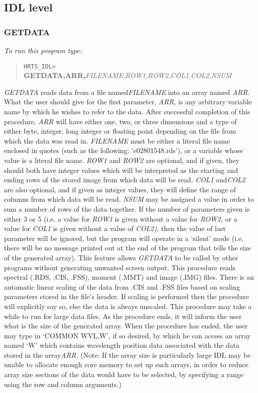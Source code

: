 \subsection{IDL level}    

\subsubsection{GETDATA}

{\em To run this program type:}
\begin{quote}
{\tt HRTS\_IDL> }{\bf GETDATA,ARR,}{\it FILENAME,ROW1,ROW2,COL1,COL2,NSUM}  
\end{quote}
{\em GETDATA} reads data from a file named{\em FILENAME} into an array named       
{\em ARR.}  What the user should give for the first parameter, {\em ARR,} is any
 arbitrary variable name by which he wishes to refer to the data.  After
 successful completion of this procedure, {\em ARR} will have either one, two,
 or three dimensions and a type of either byte, integer, long integer or
 floating point depending on the file from which the data was read in.
{\em FILENAME} must be either a literal file name enclosed in quotes (such as
 the following: 'e02801548.rds'), or a variable
 whose value is a literal file name. {\em ROW1} and {\em ROW2} are optional, and 
if
 given, they should both have integer values which will be
 interpreted as the starting and ending rows of the stored image from
 which data will be read. {\em COL1} and{\em COL2} are also optional, and if 
given
 as integer values, they will define the range of columns from
 which data will be read. {\em NSUM} may be assigned a value in order to sum
 a number of rows of the data together.  If the number of parameters
 given is either 3 or 5 (i.e. a value for {\em ROW1} is given without a value
 for {\em ROW2,} or a value for {\em COL1} is given without a value of {\em
 COL2),} then
 the value of last parameter will be ignored, but the program will
 operate in a `silent' mode (i.e. there will be no message printed out
 at the end of the program that tells the size of the generated array).
 This feature allows {\em GETDATA} to be called by other programs without
 generating unwanted screen output.
 This procedure reads spectral (.RDS, .CIS, .FSS), moment (.MMT) and
 image (.IMG) files.  There is an automatic linear scaling of the data
 from .CIS and .FSS files based on scaling parameters stored in the
 file's header.  If scaling is performed then the procedure will
 explicitly say so, else the data is always unscaled.
 This procedure may take a while to run for large data files.  As the
 procedure ends, it will inform the user what is the size of the
 generated array.  When the procedure has ended, the user may type in
`COMMON WVL,W', if so desired, by which he can access an array named
`W' which contains wavelength position data associated with the data
 stored in the array{\em ARR.} (Note: If the array size is particularly large 
 IDL may be unable to allocate enough core memory to set up such arrays, in
 order to reduce array size sections of the data would have to be selected, by
 specifying a range using the row and column arguments.)

